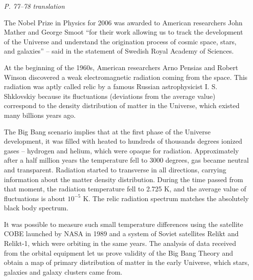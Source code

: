 \documentclass[a4paper, 12pt]{article}
\def\task#1{\begin{center}\it #1\end{center}}
\begin{document}
\task{P. 77--78 translation}
The Nobel Prize in Physics for 2006 was awarded to American researchers John 
Mather and George Smoot ``for their work allowing us to track the development 
of the Universe and understand the origination process of cosmic space, stars, 
and galaxies'' -- said in the statement of Swedish Royal Academy of Sciences.

At the beginning of the 1960s, American researchers Arno Pensias and Robert 
Winson discovered a weak electromagnetic radiation coming from the space. This 
radiation was aptly called relic by a famous Russian astrophysicist I. S. 
Shklovskiy because its fluctuations (deviations from the average value) 
correspond to the density distribution of matter in the Universe, which existed 
many billions years ago.

The Big Bang scenario implies that at the first phase of the Universe 
development, it was filled with heated to hundreds of thousands degrees ionized 
gases -- hydrogen and helium, which were opaque for radiation. Approximately 
after a half million years the temperature fell to 3000 degrees, gas became 
neutral and transparent. Radiation started to transverse in all directions, 
carrying information about the matter density distribution. During the time 
passed from that moment, the radiation temperature fell to 2.725 K, and the 
average value of fluctuations is about $10^{-5}$ K. The relic radiation 
spectrum matches the absolutely black body spectrum.

It was possible to measure such small temperature differences using the 
satellite COBE launched by NASA in 1989 and a system of Soviet satellites 
Relikt and Relikt-1, which were orbiting in the same years. The analysis of 
data received from the orbital equipment let us prove validity of the Big Bang 
Theory and obtain a map of primary distribution of matter in the early 
Universe, which stars, galaxies and galaxy clusters came from.
\end{document}
